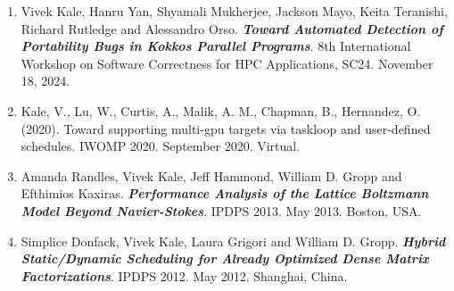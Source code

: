 
\begin{enumerate}
\item Vivek Kale, Hanru Yan, Shyamali Mukherjee, Jackson Mayo, Keita Teranishi, Richard Rutledge and Alessandro Orso. \textbf{\it Toward Automated Detection of Portability Bugs in Kokkos Parallel Programs}. 8th International Workshop on Software Correctness for HPC Applications, SC24. November 18, 2024. 

\item Kale, V., Lu, W., Curtis, A., Malik, A. M., Chapman, B., Hernandez, O. (2020). Toward supporting multi-gpu targets via taskloop and user-defined schedules. IWOMP 2020. September 2020. Virtual. 
\item Amanda Randles, Vivek Kale, Jeff Hammond, William D. Gropp and Efthimios Kaxiras. \textbf{\textit{Performance Analysis of the Lattice Boltzmann Model Beyond Navier-Stokes}}. IPDPS 2013. May 2013. Boston, USA.

\item Simplice Donfack, Vivek Kale, Laura Grigori and William D. Gropp. \textbf{\textit{Hybrid Static/Dynamic Scheduling for Already Optimized Dense Matrix Factorizations}}. IPDPS 2012. May 2012. Shanghai, China.



\end{enumerate} 
